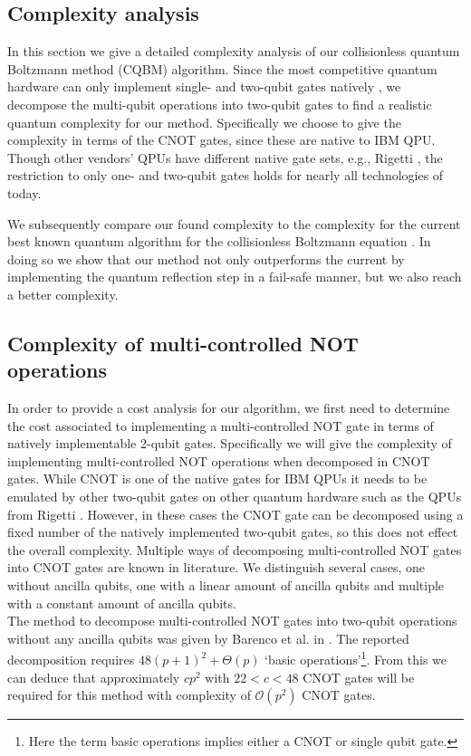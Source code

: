 \subsection{Complexity analysis\label{sec:comparison to state of the art}}
In this section we give a detailed complexity analysis of our collisionless quantum Boltzmann method (CQBM) algorithm. 
Since the most competitive quantum hardware can only implement single- and two-qubit gates natively \cite{Rigetti} \cite{IBM}, we decompose the multi-qubit operations into two-qubit gates to find a realistic quantum complexity for our method. Specifically we choose to give the complexity in terms of the CNOT gates, since these are native to IBM QPU. Though other vendors' QPUs have different native gate sets, e.g., Rigetti \cite{Rigetti}, the restriction to only one- and two-qubit gates holds for nearly all technologies of today. 

We subsequently compare our found complexity to the complexity for the current best known quantum algorithm for the collisionless Boltzmann equation \cite{Todorova2020}. In doing so we show that our method not only outperforms the current  by implementing the quantum reflection step in a fail-safe manner, but we also reach a better complexity.

\subsection{Complexity of multi-controlled NOT operations\label{ssec:multinot compl}}
In order to provide a cost analysis for our algorithm, we first need to determine the cost associated to implementing a multi-controlled NOT gate in terms of natively implementable 2-qubit gates. Specifically we will give the complexity of implementing multi-controlled NOT operations when decomposed in CNOT gates. While CNOT is one of the native gates for IBM QPUs \cite{IBM} it needs to be emulated by other two-qubit gates on other quantum hardware such as the QPUs from Rigetti \cite{Rigetti}. However, in these cases the CNOT gate can be decomposed using a fixed number of the natively implemented two-qubit gates, so this does not effect the overall complexity. 
Multiple ways of decomposing multi-controlled NOT gates into CNOT gates are known in literature. We distinguish several cases, one without ancilla qubits, one with a linear amount of ancilla qubits and multiple with a constant amount of ancilla qubits. \\

The method to decompose multi-controlled NOT gates into two-qubit operations without any ancilla qubits was given by Barenco et al. in \cite{Barenco1995}. The reported decomposition requires $48(p+1)^2 + \Theta(p)$ `basic operations'\footnote{Here the term basic operations implies either a CNOT or single qubit gate.}. From this we can deduce that approximately $c p^2$ with $22<c<48$ CNOT gates will be required for this method with complexity of $\mathcal{O}\left (p^2\right )$ CNOT gates. \\

